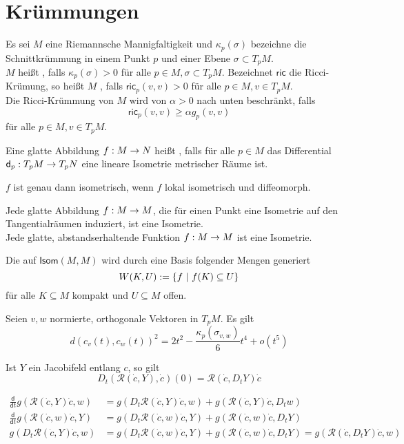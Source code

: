 \documentclass{article}
\renewcommand{\d}{\textsf{d}}
\newcommand{\Rc}{\mathcal{R}}
\newcommand{\ric}{\textsf{ric}}
\begin{document}
\section{Krümmungen}

\Def{}
Es sei $M$ eine Riemannsche Mannigfaltigkeit und $\kappa_p(\sigma)$ bezeichne die Schnittkrümmung in einem Punkt $p$ und einer Ebene $\sigma \subset T_pM$.\\
$M$ heißt , falls $\kappa_p(\sigma) > 0$ für alle $p \in M, \sigma \subset T_pM$.
Bezeichnet $\ric$ die Ricci-Krümung, so heißt $M$ , falls $\ric_p(v,v) > 0$ für alle $p \in M, v \in T_pM$.\\
Die Ricci-Krümmung von $M$ wird von $\alpha > 0$ nach unten beschränkt, falls
\[ \ric_p(v,v) \geq \alpha g_p(v,v) \]
für alle $p \in M, v \in T_pM$.

Eine glatte Abbildung $f : M \overset{}{\rightarrow} N$ heißt , falls für alle $p \in M$ das Differential $\d_p : T_pM \pfeil{} T_pN$ eine lineare Isometrie metrischer Räume ist.

\Bem{}
$f$ ist genau dann isometrisch, wenn $f$ lokal isometrisch und diffeomorph.

\Satz{}
Jede glatte Abbildung $f : M \overset{}{\rightarrow} M$, die für einen Punkt eine Isometrie auf den Tangentialräumen induziert, ist eine Isometrie.\\
Jede glatte, abstandserhaltende Funktion $f : M \overset{}{\rightarrow} M$ ist eine Isometrie.

\Def{}
Die  auf $\textsf{Isom}(M,M)$ wird durch eine Basis folgender Mengen generiert
\[ W(K,U) := \set{f}{ f(K) \subseteq U } \]
für alle $K \subseteq M$ kompakt und $ U \subseteq M$ offen.

Seien $v,w$ normierte, orthogonale Vektoren in $T_pM$. Es gilt
\[ d(c_v(t), c_w(t))^2 = 2t^2 - \frac{\kappa_p(\sigma_{v,w})}{6} t^4 + o(t^5)  \]

\Lem{}
Ist $Y$ ein Jacobifeld entlang $c$, so gilt
\[ D_t(\Rc (\dot{c}, Y), \dot{c})(0) = \Rc (\dot{c}, D_tY)\dot{c}  \]
\begin{Beweis}{}
\begin{align*}
\frac{\d}{\d t} g(\Rc(\dot{c} , Y) \dot{c}, w ) &= g(D_t \Rc(\dot{c}, Y) \dot{c}, w ) + g(\Rc (\dot{c}, Y) \dot{c}, D_tw )\\
\frac{\d}{\d t} g(\Rc(\dot{c} , w) \dot{c}, Y ) &= g(D_t \Rc(\dot{c}, w) \dot{c}, Y ) + g(\Rc (\dot{c}, w) \dot{c}, D_tY )\\
g(D_t \Rc(\dot{c}, Y) \dot{c}, w ) &= g(D_t \Rc(\dot{c}, w) \dot{c}, Y ) + g(\Rc(\dot{c}, w) \dot{c}, D_tY ) =  g(\Rc(\dot{c}, D_tY) \dot{c}, w )
\end{align*}
\end{Beweis}
\end{document}
